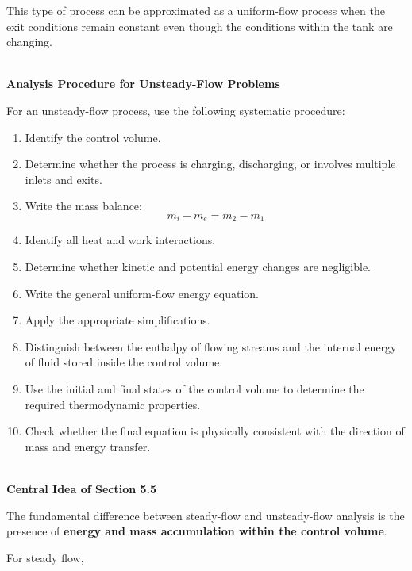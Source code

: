 \documentclass[12pt]{article}
\begin{document}
This type of process can be approximated as a uniform-flow process when the exit conditions remain constant even though the conditions within the tank are changing.

\newpage
\textbf{\\ Analysis Procedure for Unsteady-Flow Problems}

For an unsteady-flow process, use the following systematic procedure:

\begin{enumerate}
    \item Identify the control volume.
    
    \item Determine whether the process is charging, discharging, or involves multiple inlets and exits.
    
    \item Write the mass balance:
    \[
    m_i-m_e=m_2-m_1
    \]
    
    \item Identify all heat and work interactions.
    
    \item Determine whether kinetic and potential energy changes are negligible.
    
    \item Write the general uniform-flow energy equation.
    
    \item Apply the appropriate simplifications.
    
    \item Distinguish between the enthalpy of flowing streams and the internal energy of fluid stored inside the control volume.
    
    \item Use the initial and final states of the control volume to determine the required thermodynamic properties.
    
    \item Check whether the final equation is physically consistent with the direction of mass and energy transfer.
\end{enumerate}

\textbf{\\ Central Idea of Section 5.5}

The fundamental difference between steady-flow and unsteady-flow analysis is the presence of \textbf{energy and mass accumulation within the control volume}.

For steady flow,
\end{document}
